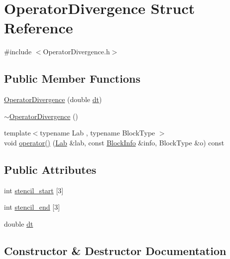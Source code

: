 \hypertarget{struct_operator_divergence}{}\section{Operator\+Divergence Struct Reference}
\label{struct_operator_divergence}


{\ttfamily \#include $<$Operator\+Divergence.\+h$>$}

\subsection*{Public Member Functions}
\begin{DoxyCompactItemize}
\item 
\hyperlink{struct_operator_divergence_a92331667e69c3d2bd224e018aabd468e}{Operator\+Divergence} (double \hyperlink{struct_operator_divergence_ada6d0bb3bcf2d97b8051e12fc09faa72}{dt})
\item 
\hyperlink{struct_operator_divergence_a52a4ddc9c34920a5bb89bfa11e22fba1}{$\sim$\+Operator\+Divergence} ()
\item 
{\footnotesize template$<$typename Lab , typename Block\+Type $>$ }\\void \hyperlink{struct_operator_divergence_a84b0abc1e4b1dc921c144a08cb3059a7}{operator()} (\hyperlink{_definitions_8h_ad6f951af9a2a6ebc1975404882b34314}{Lab} \&lab, const \hyperlink{struct_block_info}{Block\+Info} \&info, Block\+Type \&o) const 
\end{DoxyCompactItemize}
\subsection*{Public Attributes}
\begin{DoxyCompactItemize}
\item 
int \hyperlink{struct_operator_divergence_a748e5b6432ead32ed1570ab7b2ed1346}{stencil\+\_\+start} \mbox{[}3\mbox{]}
\item 
int \hyperlink{struct_operator_divergence_a1d109938ee351b7adc0bf85b3cf2656e}{stencil\+\_\+end} \mbox{[}3\mbox{]}
\item 
double \hyperlink{struct_operator_divergence_ada6d0bb3bcf2d97b8051e12fc09faa72}{dt}
\end{DoxyCompactItemize}


\subsection{Constructor \& Destructor Documentation}
\hypertarget{struct_operator_divergence_a92331667e69c3d2bd224e018aabd468e}{}
